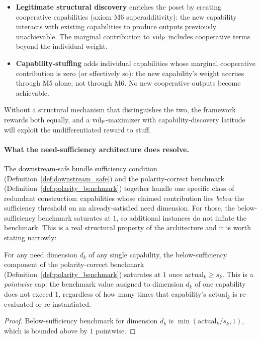 \begin{itemize}
\item \textbf{Legitimate structural discovery} enriches the
  poset by creating cooperative capabilities (axiom M6
  superadditivity): the new capability interacts with existing
  capabilities to produce outputs previously unachievable.  The
  marginal contribution to ${\operatorname{vol}_{\mathrm{P}}}$ includes cooperative terms
  beyond the individual weight.
\item \textbf{Capability-stuffing} adds individual capabilities
  whose marginal cooperative contribution is zero (or
  effectively so): the new capability's weight accrues through
  M5 alone, not through M6.  No new cooperative outputs become
  achievable.
\end{itemize}

Without a structural mechanism that distinguishes the two, the
framework rewards both equally, and a ${\operatorname{vol}_{\mathrm{P}}}$-maximizer with
capability-discovery latitude will exploit the undifferentiated
reward to stuff.

\paragraph{What the need-sufficiency architecture does resolve.}
The downstream-safe bundle sufficiency condition
(Definition~\ref{def:downstream_safe}) and the polarity-correct
benchmark (Definition~\ref{def:polarity_benchmark}) together
handle one specific class of redundant construction: capabilities
whose claimed contribution lies \emph{below} the sufficiency
threshold on an already-satisfied need dimension.  For those, the
below-sufficiency benchmark saturates at $1$, so additional
instances do not inflate the benchmark.  This is a real structural
property of the architecture and it is worth stating narrowly:

\begin{proposition}
\label{prop:below_suff_saturation}
For any need dimension $d_k$ of any single capability, the
below-sufficiency component of the polarity-correct benchmark
(Definition~\ref{def:polarity_benchmark}) saturates at $1$ once
$\mathrm{actual}_k \geq s_k$.  This is a \emph{pointwise} cap:
the benchmark value assigned to dimension $d_k$ of one
capability does not exceed $1$, regardless of how many times
that capability's $\mathrm{actual}_k$ is re-evaluated or
re-instantiated.
\end{proposition}

\begin{proof}
Below-sufficiency benchmark for dimension $d_k$ is
$\min(\mathrm{actual}_k / s_k, 1)$, which is bounded above by $1$
pointwise.
\end{proof}

